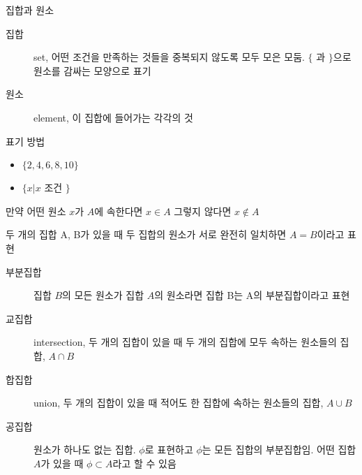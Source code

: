 \documentclass[10pt,t]{beamer}
\begin{document}
\begin{frame}{집합과 원소}
\begin{description}
    \item[집합] set, 어떤 조건을 만족하는 것들을 중복되지 않도록 모두 모은 모둠. $\{$ 과 $\}$으로 원소를 감싸는 모양으로 표기
    \item[원소] element, 이 집합에 들어가는 각각의 것  
\end{description}

\begin{block}{표기 방법}
    \begin{itemize}
        \item $\{2, 4, 6, 8, 10\}$
        \item $\{x | x $ 조건 $\}$
    \end{itemize}
\end{block}

만약 어떤 원소 $x$가 $A$에 속한다면 $x \in A$ 그렇지 않다면 $x \notin A$

두 개의 집합 A, B가 있을 때 두 집합의 원소가 서로 완전히 일치하면 $A= B$이라고 표현

\begin{description}
    \item[부분집합] 집합 $B$의 모든 원소가 집합 $A$의 원소라면 집합 B는 A의 부분집합이라고 표현
    \item[교집합] intersection, 두 개의 집합이 있을 때 두 개의 집합에 모두 속하는 원소들의 집합, $A \cap B$
    \item[합집합] union, 두 개의 집합이 있을 때 적어도 한 집합에 속하는 원소들의 집합, $A \cup B$
    \item[공집합] 원소가 하나도 없는 집합. $\phi$로 표현하고 $\phi$는 모든 집합의 부분집합임. 어떤 집합 $A$가 있을 때 $\phi \subset A$라고 할 수 있음  
\end{description}
\pagebreak

\def\firstcircle{(0,0) circle (1.cm)}
\def\secondcircle{(0:1.5cm) circle (1.cm)}

\begin{columns}
    

\end{columns}
\end{frame}
\end{document}
